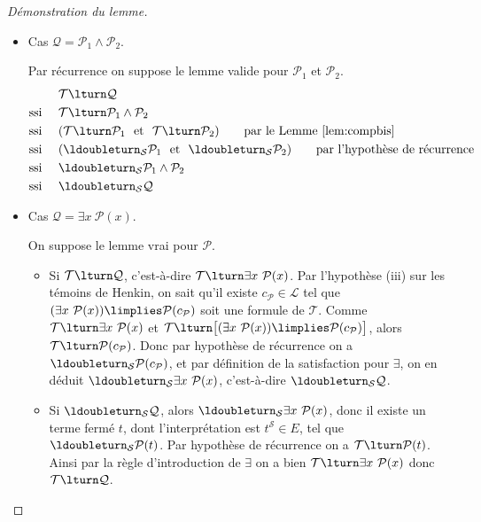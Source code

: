 \documentclass[11pt,class=report,crop=false]{standalone}
\begin{document}
\begin{proof}[Démonstration du lemme]
\begin{itemize}
		\item Cas $\mathcal{Q} = \mathcal{P}_1 \land \mathcal{P}_2$.
		
		Par récurrence on suppose le lemme valide pour $\mathcal{P}_1$ et $\mathcal{P}_2$.
		\begin{align*}
			& \mathcal{T} \lturn \mathcal{Q} \\
			\text{ssi } \quad & \mathcal{T} \lturn \mathcal{P}_1 \land \mathcal{P}_2 \\
			\text{ssi } \quad & (\mathcal{T} \lturn \mathcal{P}_1 \ \text{ et } \  \mathcal{T} \lturn \mathcal{P}_2) \qquad \text{par le Lemme \ref{lem:compbis}}\\
			\text{ssi } \quad & (\ldoubleturn_{\mathcal{S}} \mathcal{P}_1 \ \text{ et } \ \ldoubleturn_{\mathcal{S}} \mathcal{P}_2) \qquad \text{par l'hypothèse de récurrence}\\
			\text{ssi } \quad & \ldoubleturn_{\mathcal{S}} \mathcal{P}_1 \land \mathcal{P}_2 \\
			\text{ssi } \quad & \ldoubleturn_{\mathcal{S}} \mathcal{Q}
		\end{align*}
		

		\item Cas $\mathcal{Q} = \exists x\ \mathcal{P}(x)$.
		
		On suppose le lemme vrai pour $\mathcal{P}$.
		\begin{itemize}
			\item Si $\mathcal{T} \lturn \mathcal{Q}$, c'est-à-dire $\mathcal{T} \lturn \exists x\ \mathcal{P}(x)$. Par l'hypothèse (iii) sur les témoins de Henkin, on sait qu'il existe $c_{\mathcal{P}} \in \mathcal{L}$ tel que \og{}$(\exists x\ \mathcal{P}(x)) \limplies \mathcal{P}(c_{\mathcal{P}})$\fg{} soit une formule de $\mathcal{T}$.
			Comme $\mathcal{T} \lturn \exists x\ \mathcal{P}(x)$ et $\mathcal{T} \lturn \big[ (\exists x\ \mathcal{P}(x)) \limplies \mathcal{P}(c_{\mathcal{P}}) \big]$, alors $\mathcal{T} \lturn \mathcal{P}(c_{\mathcal{P}})$.
			Donc par hypothèse de récurrence on a $\ldoubleturn_{\mathcal{S}} \mathcal{P}(c_{\mathcal{P}})$,  et par définition de la satisfaction pour $\exists$, on en déduit $\ldoubleturn_{\mathcal{S}} \exists x\ \mathcal{P}(x)$, c'est-à-dire $\ldoubleturn_{\mathcal{S}} \mathcal{Q}$.
			
			
			\item Si $\ldoubleturn_{\mathcal{S}} \mathcal{Q}$, alors $\ldoubleturn_{\mathcal{S}} \exists x\ \mathcal{P}(x)$, donc 
			il existe un terme fermé $t$, dont l'interprétation est $t^{\mathcal{S}} \in E$, tel que $\ldoubleturn_{\mathcal{S}} \mathcal{P}(t)$.			
			Par hypothèse de récurrence on a $\mathcal{T} \lturn \mathcal{P}(t)$. Ainsi par la règle d'introduction de $\exists$ on a bien $\mathcal{T} \lturn \exists x\ \mathcal{P}(x)$ donc $\mathcal{T} \lturn \mathcal{Q}$.			
		\end{itemize}
		
	\end{itemize}
\end{proof}
\end{document}
